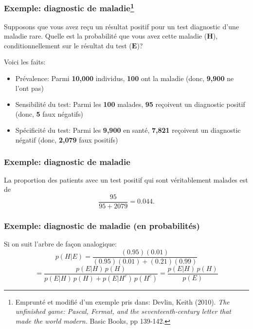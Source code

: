 \documentclass{beamer}
\begin{document}
\begin{frame}
    \frametitle{Exemple: diagnostic de maladie\footnote{
        Emprunté et modifié d'un exemple pris dans: Devlin, Keith (2010).
        \emph{The unfinished game: Pascal, Fermat, and the seventeenth-century letter that made the world modern.}
        Basic Books, pp 139-142.
    }}
    Supposons que vous avez reçu un résultat positif pour un test diagnostic d'une maladie rare.
    Quelle est la probabilité que vous avez cette maladie ($\boldsymbol{H}$),
    conditionnellement sur le résultat du test ($\boldsymbol{E}$)?

    \pause

    \vfill

    Voici les faits:
    \begin{itemize}
      \item Prévalence: Parmi \textbf{10,000} individus, \textbf{100} ont la maladie (donc, \textbf{9,900} ne l'ont pas)
      \pause
      \item Sensibilité du test: Parmi les \textbf{100} malades,
            \textbf{95} reçoivent un diagnostic positif (donc, \textbf{5} faux négatifs)
      \pause
      \item Spécificité du test: Parmi les \textbf{9,900} en santé,
            \textbf{7,821} reçoivent un diagnostic négatif (donc, \textbf{2,079} faux positifs)
    \end{itemize}
\end{frame}


\begin{frame}
    \frametitle{Exemple: diagnostic de maladie}
    \begin{figure}
      \centering
      \scalebox{0.75}{}
    \end{figure}

    \pause

    La proportion des patients avec un test positif qui sont véritablement malades est de
    \[\frac{95}{95 + 2079} = 0.044 .\]
\end{frame}


\begin{frame}
    \frametitle{Exemple: diagnostic de maladie (en probabilités)}
    \begin{figure}
      \centering
      \scalebox{0.65}{}
    \end{figure}

    \pause

    Si on suit l'arbre de façon analogique:
    \[p(H | E) = \frac{(0.95)(0.01)}{(0.95)(0.01) + (0.21)(0.99)}\]
    \pause
    \[ = \frac{p(E | H) \, p(H)}{p(E | H) \, p(H) + p(E | H^c) \, p(H^c)} = \frac{p(E | H) \, p(H)}{p(E)}\]
\end{frame}
\end{document}

